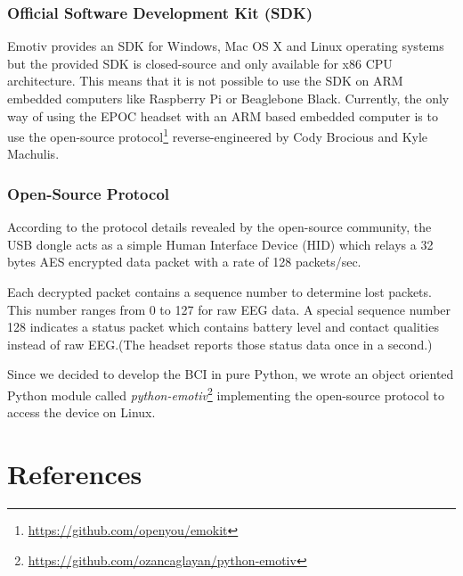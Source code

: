 \documentclass[12pt]{article}
\newcommand\mysubsubsection[1]{\subsubsection{#1}}
\numberwithin{equation}{section}
\numberwithin{figure}{section}
\numberwithin{table}{section}
\begin{document}
\mysubsubsection{Official Software Development Kit (SDK)}\label{seq:emotivepoceeg_sdk}

\par{
Emotiv provides an SDK for Windows, Mac OS X and Linux operating systems but the provided SDK is 
closed-source and only available for x86 CPU architecture. This means that it is not possible 
to use the SDK on ARM embedded computers like Raspberry Pi or Beaglebone Black. 
Currently, the only way of using the EPOC headset with an ARM based embedded computer is to use the 
open-source protocol\footnote{\url{https://github.com/openyou/emokit}} reverse-engineered by Cody Brocious and Kyle Machulis. 
}

\mysubsubsection{Open-Source Protocol}\label{seq:emotivepoceeg_opensource}

\par{
According to the protocol details revealed by the open-source community, 
the USB dongle acts as a simple Human Interface Device (HID) which relays a 
32 bytes AES encrypted data packet with a rate of 128 packets/sec.
}

\par{
Each decrypted packet contains a sequence number to determine lost packets. 
This number ranges from 0 to 127 for raw EEG data. A special sequence number 
128 indicates a status packet which contains battery level and contact 
qualities instead of raw EEG.(The headset reports those status data once in a second.)
}

\par{
Since we decided to develop the BCI in pure Python, we wrote an object oriented 
Python module called \emph{python-emotiv}\footnote{\url{https://github.com/ozancaglayan/python-emotiv}} implementing the open-source protocol to access the device on Linux.
}


\clearpage
\vspace*{-0.35cm}
\thispagestyle{empty}
\section*{References}
%
%
\end{document}
